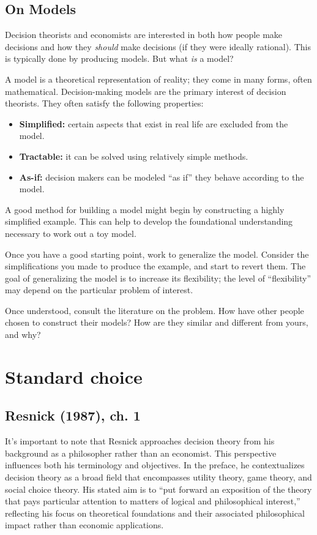 \documentclass[letterpaper, 12pt, titlepage]{article}
\begin{document}
\subsection{On Models}
\label{subsec:models}

Decision theorists and economists are interested in both how people make
decisions and how they \emph{should} make decisions (if they were ideally
rational). This is typically done by producing models. But what \emph{is}
a model?

A model is a theoretical representation of reality; they come in many
forms, often mathematical. Decision-making models are the primary interest
of decision theorists. They often satisfy the following properties:
\begin{itemize}
\item \textbf{Simplified:} certain aspects that exist in real life are
  excluded from the model.
\item \textbf{Tractable:} it can be solved using relatively simple methods.
\item \textbf{As-if:} decision makers can be modeled ``as if'' they behave
  according to the model.
\end{itemize}

A good method for building a model might begin by constructing a highly
simplified example. This can help to develop the foundational understanding
necessary to work out a toy model.

Once you have a good starting point, work to generalize the model. Consider the
simplifications you made to produce the example, and start to revert them.  The
goal of generalizing the model is to increase its flexibility; the level of
``flexibility'' may depend on the particular problem of interest.

Once understood, consult the literature on the problem. How have other people
chosen to construct their models? How are they similar and different from yours,
and why?

\section{Standard choice}
\label{sec:standard-choice}


\subsection{Resnick (1987), ch. 1}
\label{subsec:resnick}

It's important to note that Resnick approaches decision theory from his
background as a philosopher rather than an economist. This perspective
influences both his terminology and objectives. In the preface, he
contextualizes decision theory as a broad field that encompasses utility theory,
game theory, and social choice theory. His stated aim is to ``put forward an
exposition of the theory that pays particular attention to matters of logical
and philosophical interest,'' reflecting his focus on theoretical foundations and
their associated philosophical impact rather than economic applications.
\end{document}
